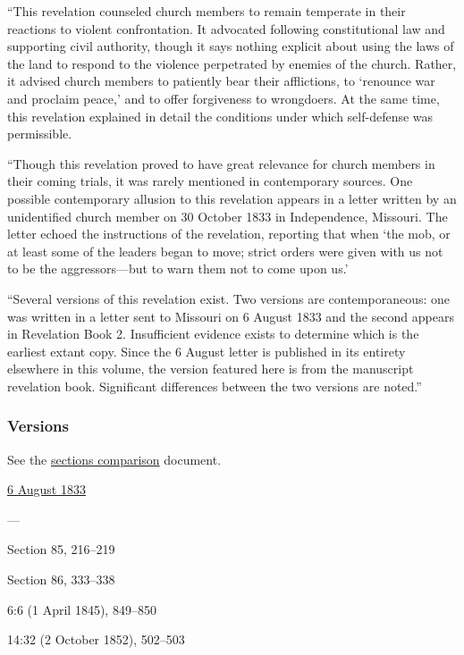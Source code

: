 			``This revelation counseled church members to remain temperate in their reactions to violent confrontation. It advocated following constitutional law and supporting civil authority, though it says nothing explicit about using the laws of the land to respond to the violence perpetrated by enemies of the church. Rather, it advised church members to patiently bear their afflictions, to `renounce war and proclaim peace,' and to offer forgiveness to wrongdoers. At the same time, this revelation explained in detail the conditions under which self-defense was permissible.
			
			``Though this revelation proved to have great relevance for church members in their coming trials, it was rarely mentioned in contemporary sources. One possible contemporary allusion to this revelation appears in a letter written by an unidentified church member on 30 October 1833 in Independence, Missouri. The letter echoed the instructions of the revelation, reporting that when `the mob, or at least some of the leaders began to move; strict orders were given with us not to be the aggressors---but to warn them not to come upon us.'
			
			``Several versions of this revelation exist. Two versions are contemporaneous: one was written in a letter sent to Missouri on 6 August 1833 and the second appears in Revelation Book 2. Insufficient evidence exists to determine which is the earliest extant copy. Since the 6 August letter is published in its entirety elsewhere in this volume, the version featured here is from the manuscript revelation book. Significant differences between the two versions are noted.''
				
	\subsubsection{Versions}
		\label{DC98-V}
		
		See the \href{https://drive.google.com/file/d/1goAvNz8jS4R8slYfMG_db55Ty2z_vmgK/view?usp=sharing}{sections comparison} document.
	
		\begin{compactdesc}
			\item[JSP] \hyperref[EMS-1833-JS-6-AUG-1833]{6 August 1833}
			\item[BC] ---
			\item[DC 1835] Section 85, 216--219
			\item[DC 1844] Section 86, 333--338
			\item[TS] 6:6 (1 April 1845), 849--850
			\item[MS] 14:32 (2 October 1852), 502--503
		\end{compactdesc}

